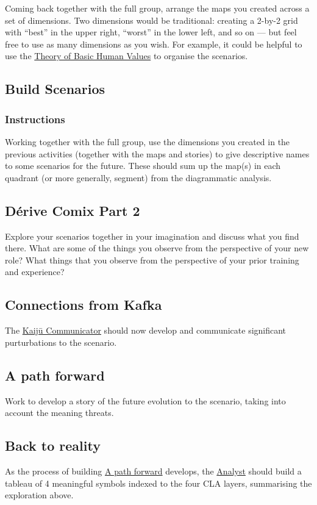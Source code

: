 \documentclass{article}
\begin{document}
Coming back together with the full group, arrange the maps you created
across a set of dimensions.  Two dimensions would be traditional:
creating a 2-by-2 grid with ``best'' in the upper right, ``worst'' in
the lower left, and so on — but feel free to use as many dimensions as
you wish.  For example, it could be helpful to use the \href{https://en.wikipedia.org/wiki/Theory\_of\_Basic\_Human\_Values}{Theory of Basic
Human Values} to organise the scenarios.
\subsection{Build Scenarios}

\subsubsection{Instructions}

Working together with the full group, use the dimensions you created
in the previous activities (together with the maps and stories) to
give descriptive names to some scenarios for the future.  These should
sum up the map(s) in each quadrant (or more generally, segment) from
the diagrammatic analysis.
\subsection{Dérive Comix Part 2}
\label{f447153f-7ff5-449d-bb08-67f579dda53f}
Explore your scenarios together in your imagination and discuss what
you find there.  What are some of the things you observe from the
perspective of your new role?  What things that you observe from the
perspective of your prior training and experience?
\subsection{Connections from Kafka}
\label{34be214c-5885-4794-b93c-84e49ddad18b}
The \hyperref[a0796d9e-664b-46fa-bb37-7f6a6fc15584]{Kaijū Communicator} should now develop and communicate significant
purturbations to the scenario.
\subsection{A path forward}
\label{7c0dce3b-d5ea-4712-a771-6ff26f143686}
Work to develop a story of the future evolution to the scenario,
taking into account the meaning threats.
\subsection{Back to reality}
\label{e38d2006-bcf7-494b-bd51-d8932b1ed0cd}
As the process of building \hyperref[7c0dce3b-d5ea-4712-a771-6ff26f143686]{A path forward} develops, the \hyperref[5826c7d9-8962-433d-83c5-27a5196908ea]{Analyst} should
build a tableau of 4 meaningful symbols indexed to the four CLA
layers, summarising the exploration above.
\end{document}
